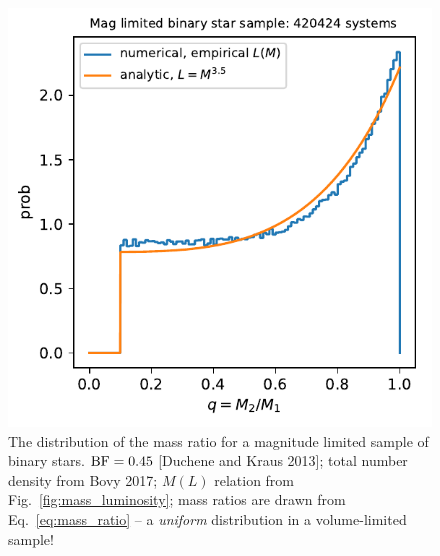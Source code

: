 \documentclass{emulateapj}
\begin{document}
\begin{figure}[!t]
	\begin{center}
		\includegraphics[scale=.8]{figures/q_distribn_mag_limited.pdf}
	\end{center}
	\caption{The distribution of the mass ratio for a magnitude limited 
		sample of binary stars. ${\rm BF} = 0.45$ [Duchene and Kraus 2013]; 
		total 
		number density from Bovy 2017; $M(L)$ relation from 
		Fig.~\ref{fig:mass_luminosity}; mass ratios are drawn from 
		Eq.~\ref{eq:mass_ratio} -- a \textit{uniform} distribution in a 
		volume-limited sample!}
	\label{fig:q_distribn_mag_limited}
\end{figure}
\end{document}
